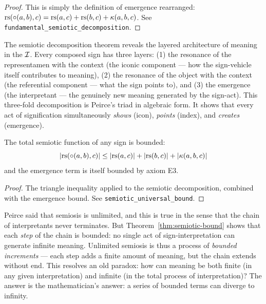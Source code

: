 \begin{proof}
This is simply the definition of emergence rearranged:
$\mathrm{rs}(\circ(a,b), c) = \mathrm{rs}(a,c) + \mathrm{rs}(b,c) + \kappa(a,b,c)$.
See \texttt{fundamental\_semiotic\_decomposition}.
\end{proof}

\begin{interpretation}
The semiotic decomposition theorem reveals the layered architecture
of meaning in the $\mathcal{I}$. Every composed sign has three layers: (1) the
resonance of the representamen with the context (the iconic component
--- how the sign-vehicle itself contributes to meaning), (2) the
resonance of the object with the context (the referential component
--- what the sign points to), and (3) the emergence (the interpretant
--- the genuinely new meaning generated by the sign-act). This three-fold
decomposition is Peirce's triad in algebraic form. It shows that
every act of signification simultaneously \emph{shows} (icon),
\emph{points} (index), and \emph{creates} (emergence).
\end{interpretation}

\begin{theorem}
\label{thm:semiotic-bound}
The total semiotic function of any sign is bounded:
\[
  |\mathrm{rs}(\circ(a, b), c)| \leq |\mathrm{rs}(a,c)| + |\mathrm{rs}(b,c)| + |\kappa(a,b,c)|
\]
and the emergence term is itself bounded by axiom E3.
\end{theorem}

\begin{proof}
The triangle inequality applied to the semiotic decomposition, combined
with the emergence bound. See \texttt{semiotic\_universal\_bound}.
\end{proof}

\begin{interpretation}
Peirce said that semiosis is unlimited, and this is true in the sense
that the chain of interpretants never terminates. But
Theorem~\ref{thm:semiotic-bound} shows that each \emph{step} of the
chain is bounded: no single act of sign-interpretation can generate
infinite meaning. Unlimited semiosis is thus a process of
\emph{bounded increments} --- each step adds a finite amount of meaning,
but the chain extends without end. This resolves an old paradox: how
can meaning be both finite (in any given interpretation) and infinite
(in the total process of interpretation)? The answer is the
mathematician's answer: a series of bounded terms can diverge to
infinity.
\end{interpretation}

